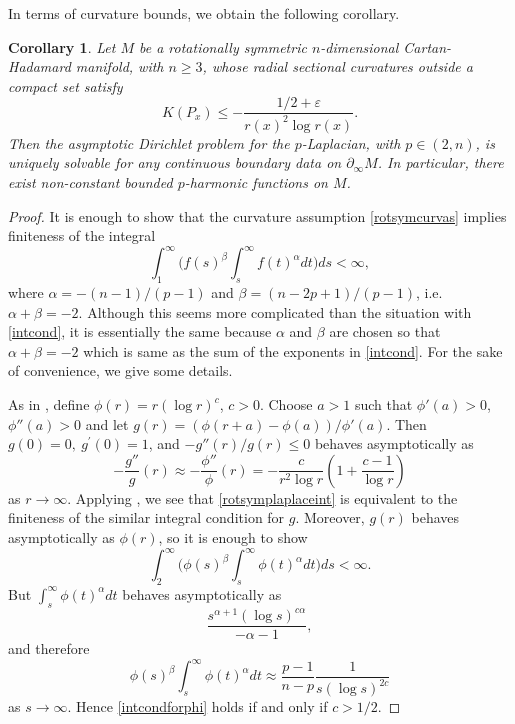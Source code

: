 \documentclass[10pt,a4paper,reqno]{amsart}
\newcommand{\ve}{\varepsilon}
\newcommand{\pinf}{\partial_{\infty}}
\numberwithin{equation}{section}
\theoremstyle{plain}
\newtheorem{cor}[thm]{Corollary}
\theoremstyle{definition}
\begin{document}
In terms of curvature bounds, we obtain the following corollary.
    \begin{cor}\label{rotsymplaplacecor}
Let $M$ be a rotationally symmetric $n$-dimensional Cartan-Hadamard manifold, with $n\ge 3$, whose radial sectional curvatures outside a compact set 
	satisfy 
  \begin{equation}\label{rotsymcurvas}
      K(P_x) \le - \frac{1/2 + \ve }{r(x)^2 \log r(x)}.
      \end{equation}
 Then the asymptotic Dirichlet problem for the $p$-Laplacian, with  $p\in(2,n)$, is uniquely solvable for any continuous boundary data on $\pinf M$. 
 In particular, there exist non-constant bounded $p$-harmonic functions on $M$.      
    \end{cor}
\begin{proof}
It is enough to show that the curvature assumption \eqref{rotsymcurvas} implies finiteness of the 
integral 
  \begin{equation*}
	\int_1^{\infty}\Big( f(s)^{\beta} \int_s^{\infty} f(t)^{\alpha} dt \Big) ds < \infty,
	\end{equation*}
 where $\alpha = -(n-1)/(p-1)$ and $\beta = (n-2p+1)/(p-1)$, i.e. $\alpha+\beta =-2$. Although this
 seems more complicated than the situation with \eqref{intcond}, it is essentially the same because
 $\alpha$ and $\beta$ are chosen so that $\alpha+\beta=-2$ which is same as the sum of the exponents
 in \eqref{intcond}. For the sake of convenience, we give some details.
 
 As in \cite{march}, define $\phi(r) = r(\log r)^c$, $c>0$. Choose $a>1$ such that $\phi'(a)>0$,
 $\phi''(a)>0$ and let $g(r) = (\phi(r+a) - \phi(a))/\phi'(a)$. Then $g(0)=0,\ g^\prime(0)=1$, and 
$-g''(r)/g(r) \le 0$ behaves asymptotically as 
    \[
    -\frac{g''}{g}(r)\approx
     -\frac{\phi''}{\phi}(r) = - \frac{c}{r^2 \log r}\left( 1 + \frac{c-1}{\log r} \right)
    \]
    as $r\to\infty$.
Applying \cite[Lemma 5]{march}, we see that \eqref{rotsymplaplaceint} is equivalent to the finiteness
of the similar integral condition for $g$. Moreover, $g(r)$ behaves asymptotically as $\phi(r)$, so
it is enough to show 
    \begin{equation}\label{intcondforphi}
     \int_2^{\infty}\Big( \phi(s)^{\beta} \int_s^{\infty} \phi(t)^{\alpha} dt \Big) ds < \infty.
    \end{equation}
But $\int_s^\infty \phi(t)^\alpha dt$ behaves asymptotically as 
\[    
  \frac{s^{\alpha+1}(\log s)^{c\alpha}}{-\alpha-1},  
 \]
 and therefore
 \[
\phi(s)^{\beta} \int_s^{\infty} \phi(t)^{\alpha}dt\approx \frac{p-1}{n-p}\frac{1}{s(\log s)^{2c}}
\]
as $s\to\infty$. 
Hence \eqref{intcondforphi} holds if and only if $c> 1/2$.
\end{proof}
\end{document}
